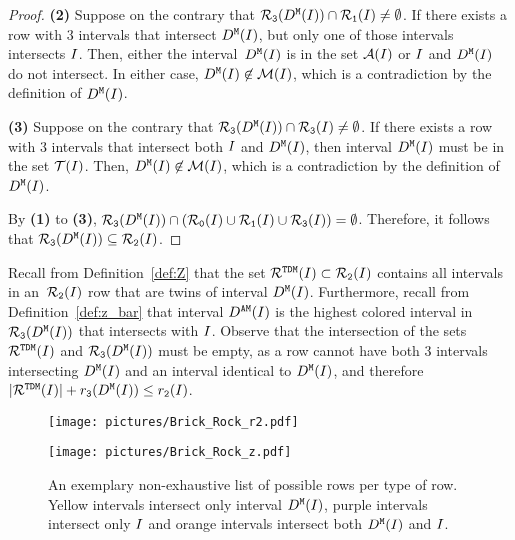 {\begin{proof}
    \textbf{(2)} Suppose on the contrary that $\mathcal{R}_\texttt{3}(D^\texttt{M}(I)) \cap \mathcal{R}_\texttt{1}(I) \neq \emptyset$.
    If there exists a row with $3$ intervals that intersect $D^\texttt{M}(I)$, but only one of those intervals intersects $I$. 
    Then, either the interval~$D^\texttt{M}(I)$ is in the set $\mathcal{A}(I)$ or $I$ and $D^\texttt{M}(I)$ do not intersect.
    In either case, $D^\texttt{M}(I) \not \in \mathcal{M}(I)$, which is a contradiction by the definition of $D^\texttt{M}(I)$.
    
    \medskip
    
    \textbf{(3)} Suppose on the contrary that $\mathcal{R}_\texttt{3}(D^\texttt{M}(I)) \cap \mathcal{R}_\texttt{3}(I) \neq \emptyset$. 
    If there exists a row with $3$ intervals that intersect both $I$ and $D^\texttt{M}(I)$, then interval $D^\texttt{M}(I)$ must be in the set $\mathcal{T}(I)$.
    Then, $D^\texttt{M}(I) \not \in \mathcal{M}(I)$, which is a contradiction by the definition of $D^\texttt{M}(I)$.
    
    \medskip
    
    By \textbf{(1)} to \textbf{(3)}, $\mathcal{R}_\texttt{3}(D^\texttt{M}(I)) \cap \left( \mathcal{R}_\texttt{0}(I) \cup \mathcal{R}_\texttt{1}(I) \cup \mathcal{R}_\texttt{3}(I) \right) = \emptyset$.
    Therefore, it follows that $\mathcal{R}_\texttt{3}(D^\texttt{M}(I)) \subseteq \mathcal{R}_\texttt{2}(I)$.
\end{proof}

Recall from Definition~\ref{def:Z} that the set $\mathcal{R}^{\texttt{TDM}}(I) \subset \mathcal{R}_\texttt{2}(I)$ contains all intervals in an~$\mathcal{R}_\texttt{2}(I)$ row that are twins of interval $D^\texttt{M}(I)$. 
Furthermore, recall from Definition~\ref{def:z_bar} that interval $D^\texttt{AM}(I)$ is the highest colored interval in $\mathcal{R}_\texttt{3}(D^\texttt{M}(I))$ that intersects with $I$.
Observe that the intersection of the sets $\mathcal{R}^{\texttt{TDM}}(I)$ and $\mathcal{R}_\texttt{3}(D^\texttt{M}(I))$ must be empty, as a row cannot have both $3$ intervals intersecting $D^\texttt{M}(I)$ and an interval identical to $D^\texttt{M}(I)$, and therefore $|\mathcal{R}^{\texttt{TDM}}(I)| + r_\texttt{3}(D^\texttt{M}(I)) \leq r_\texttt{2}(I)$.

\begin{figure}[t]
\begin{minipage}{0.35\textwidth}
\centering
\texttt{[image: pictures/Brick\_Rock\_r2.pdf]}
\end{minipage}%
\hspace{0.1\textwidth}%
\begin{minipage}{0.55\textwidth}
\centering
\texttt{[image: pictures/Brick\_Rock\_z.pdf]}
\end{minipage}
\caption{
An exemplary non-exhaustive list of possible rows per type of row.
Yellow intervals intersect only interval $D^\texttt{M}(I)$, purple intervals intersect only $I$ and orange intervals intersect both $D^\texttt{M}(I)$ and $I$.
}
\label{fig:r2_and_z_intersections}
\end{figure}

}

